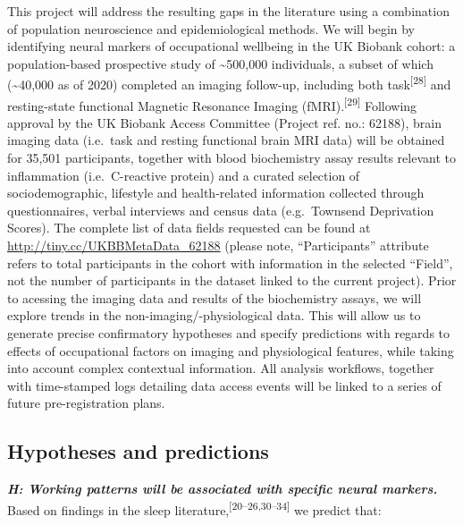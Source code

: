 \documentclass[
  english,
  man,draftall]{apa6}
\begin{document}
This project will address the resulting gaps in the literature using a combination of population neuroscience and epidemiological methods. We will begin by identifying neural markers of occupational wellbeing in the UK Biobank cohort: a population-based prospective study of \textasciitilde500,000 individuals, a subset of which (\textasciitilde40,000 as of 2020) completed an imaging follow-up, including both task\textsuperscript{{[}28{]}} and resting-state functional Magnetic Resonance Imaging (fMRI).\textsuperscript{{[}29{]}} Following approval by the UK Biobank Access Committee (Project ref. no.: 62188), brain imaging data (i.e.~task and resting functional brain MRI data) will be obtained for 35,501 participants, together with blood biochemistry assay results relevant to inflammation (i.e.~C-reactive protein) and a curated selection of sociodemographic, lifestyle and health-related information collected through questionnaires, verbal interviews and census data (e.g.~Townsend Deprivation Scores). The complete list of data fields requested can be found at \url{http://tiny.cc/UKBBMetaData_62188} (please note, ``Participants'' attribute refers to total participants in the cohort with information in the selected ``Field'', not the number of participants in the dataset linked to the current project). Prior to acessing the imaging data and results of the biochemistry assays, we will explore trends in the non-imaging/-physiological data. This will allow us to generate precise confirmatory hypotheses and specify predictions with regards to effects of occupational factors on imaging and physiological features, while taking into account complex contextual information. All analysis workflows, together with time-stamped logs detailing data access events will be linked to a series of future pre-registration plans.

\newpage

\hypertarget{hypotheses-and-predictions}{%
\subsection{Hypotheses and predictions}\label{hypotheses-and-predictions}}

\textbf{\emph{H: Working patterns will be associated with specific neural markers.}} Based on findings in the sleep literature,\textsuperscript{{[}20--26,30--34{]}} we predict that:
\end{document}
